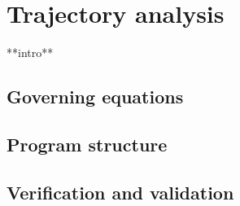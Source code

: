 \section{Trajectory analysis} \label{ch:trajectory}

**intro**

\subsection{Governing equations}



\subsection{Program structure}

\subsection{Verification and validation}